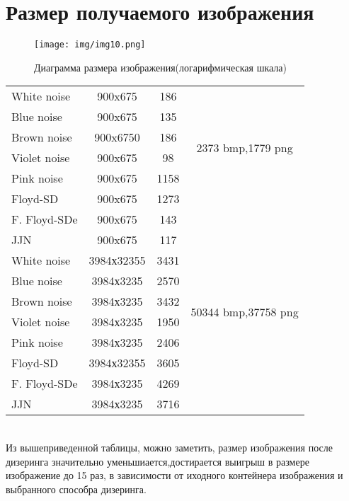 \section{Размер получаемого изображения}
\begin{figure}[h!]
	\centering
	\texttt{[image: img/img10.png]}
	\caption{Диаграмма размера изображения(логарифмическая шкала)}
	\label{fig:spire06}
\end{figure}
\begin{tabular}{|@{\hspace*{2mm}}l||*{3}{c|}}\hline
	
	&\makebox[8em]{Разрешение, пикс}&\makebox[5em]{Размер, кб} &\makebox[7em]{Исх. раз., кб}
	\\\hline\hline
	White noise&900x675&186&\multirow{6}{*}{2373 bmp,1779 png} \\\cline{1-3}
	Blue noise& 900x675&135& \\\cline{1-3}
	Brown noise&900x6750&186&\\\cline{1-3}
	Violet noise &900x675&98&\\\cline{1-3}
	Pink noise &900x675&1158&\\\cline{1-3}
	Floyd-SD& 900x675&1273&\\\cline{1-3}
	F. Floyd-SDe&900x675&143&\\\cline{1-3}
	JJN &900x675&117&\\\hline
	White noise&3984х32355&3431&\multirow{6}{*}{50344 bmp,37758 png} \\\cline{1-3}
	Blue noise& 3984х3235&2570& \\\cline{1-3}
	Brown noise&3984х3235&3432&\\\cline{1-3}
	Violet noise &3984х3235&1950&\\\cline{1-3}
	Pink noise &3984х3235&2406&\\\cline{1-3}
	Floyd-SD& 3984х32355&3605&\\\cline{1-3}
	F. Floyd-SDe&3984х3235&4269&\\\cline{1-3}
	JJN &3984х3235&3716&\\\hline
\end{tabular}
\bigskip
\\

Из вышеприведенной таблицы, можно заметить, размер изображения после дизеринга значительно уменьшиается,достирается выигрыш в размере изображение до 15 раз, в зависимости от иходного контейнера изображения и выбранного способра дизеринга.
